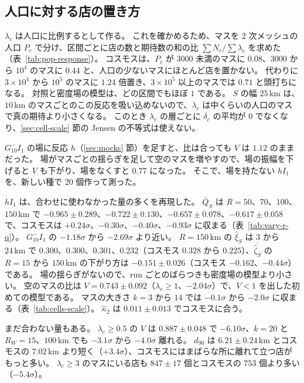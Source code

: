 \documentclass[a4paper,11pt]{ltjsarticle}
\begin{document}
\subsection{人口に対する店の置き方}
\label{sec:catchment}

$\lambda_c$ は人口に比例するとして作る。
これを確かめるため、マスを 2 次メッシュの人口 $P_c$ で分け、区間ごとに店の数と期待数の和の比 $\sum N_c / \sum \lambda_c$ を求めた（表~\ref{tab:pop-response}）。
コスモスは、$P_c$ が $3000$ 未満のマスに $0.08$、$3000$ から $10^4$ のマスに $0.44$ と、人口の少ないマスにほとんど店を置かない。
代わりに $3 \times 10^4$ から $10^5$ のマスに $1.24$ 倍置き、$3 \times 10^5$ 以上のマスでは $0.71$ と頭打ちになる。
対照と密度場の模型は、どの区間でもほぼ $1$ である。
$S$ の幅 $25\,\mathrm{km}$ は、$10\,\mathrm{km}$ のマスごとのこの反応を吸い込めないので、$\lambda_c$ は中くらいの人口のマスで真の期待より小さくなる。
このとき $\lambda_c$ の層ごとに $\delta_c$ の平均が $0$ でなくなり、\ref{sec:cell-scale} 節の Jensen の不等式は使えない。

$G_{10}^{-}I_1$ の場に反応 $h$（\ref{sec:mocks} 節）を足すと、比は合っても $V$ は $1.12$ のままだった。
場がマスごとの揺らぎを足して空のマスを増やすので、場の振幅を下げると $V$ も下がり、場をなくすと $0.77$ になった。
そこで、場を持たない $hI_1$ を、新しい種で 20 個作って測った。

$hI_1$ は、合わせに使わなかった量の多くを再現した。
$\bar Q_S$ は $R = 50$、$70$、$100$、$150\,\mathrm{km}$ で $-0.965 \pm 0.289$、$-0.722 \pm 0.130$、$-0.657 \pm 0.078$、$-0.617 \pm 0.058$ で、コスモスは $+0.24\sigma$、$-0.30\sigma$、$-0.40\sigma$、$-0.93\sigma$ に収まる（表~\ref{tab:vary-r-q}）。
$G_{10}^{-}I_1$ の $-1.18\sigma$ から $-2.69\sigma$ より近い。
$R = 150\,\mathrm{km}$ の $\hat\xi_S$ は $3$ から $24\,\mathrm{km}$ で $0.300$、$0.300$、$0.301$、$0.232$（コスモス $0.328$ から $0.225$）、$\overline{\hat\zeta_S}$ の $R = 15$ から $150\,\mathrm{km}$ の下がり方は $-0.151 \pm 0.026$（コスモス $-0.162$、$-0.44\sigma$）である。
場の揺らぎがないので、run ごとのばらつきも密度場の模型より小さい。
空のマスの比は $V = 0.743 \pm 0.092$（$\lambda_c \ge 1$、$-2.04\sigma$）で、$V < 1$ を出した初めての模型である。
マスの大きさ $k = 3$ から $14$ では $-0.1\sigma$ から $-2.0\sigma$ に収まる（表~\ref{tab:cells-scale}）。
$\hat\kappa_2$ は $0.011 \pm 0.013$ でコスモスに合う。

まだ合わない量もある。
$\lambda_c \ge 0.5$ の $V$ は $0.887 \pm 0.048$ で $-6.10\sigma$、$k = 20$ と $R_W = 15$、$100\,\mathrm{km}$ でも $-3.1\sigma$ から $-4.0\sigma$ 離れる。
$d_{90}$ は $6.21 \pm 0.24\,\mathrm{km}$ とコスモスの $7.02\,\mathrm{km}$ より短く（$+3.4\sigma$）、コスモスにはまばらな所に離れて立つ店がもっと多い。
$\lambda_c \ge 3$ のマスにいる店も $847 \pm 17$ 個とコスモスの $753$ 個より多い（$-5.4\sigma$）。
\end{document}
